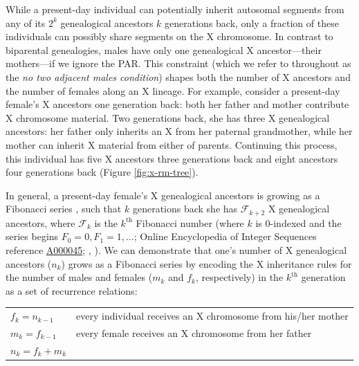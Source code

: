 \documentclass[9pt,twocolumn,twoside]{gsajnl}
\begin{document}
While a present-day individual can potentially inherit autosomal segments from
any of its $2^k$ genealogical ancestors $k$ generations back, only a fraction
of these individuals can possibly share segments on the X chromosome. In
contrast to biparental genealogies, males have only one genealogical X
ancestor---their mothers---if we ignore the PAR. This constraint (which we
refer to throughout as the \emph{no two adjacent males condition}) shapes both
the number of X ancestors and the number of females along an X lineage. For
example, consider a present-day female's X ancestors one generation back: both
her father and mother contribute X chromosome material. Two generations back,
she has three X genealogical ancestors: her father only inherits an X from her
paternal grandmother, while her mother can inherit X material from either of
parents. Continuing this process, this individual has five X ancestors three
generations back and eight ancestors four generations back (Figure
\ref{fig:x-rm-tree}). 


In general, a present-day female's X genealogical ancestors is growing as a
Fibonacci series \citep{laughlin1920calculating, Basin:1963wf}, such that $k$
generations back she has $\mathcal{F}_{k+2}$ X genealogical ancestors, where
$\mathcal{F}_k$ is the $k^\text{th}$ Fibonacci number (where $k$ is 0-indexed
and the series begins $F_0 = 0, F_1 = 1, \ldots$; Online Encyclopedia of
Integer Sequences reference \href{https://oeis.org/A000045}{A000045};
\citeauthor{sloane2014online}, \citeyear{sloane2014online}). We can demonstrate
that one's number of X genealogical ancestors ($n_k$) grows as a Fibonacci
series by encoding the X inheritance rules for the number of males and females
($m_k$ and $f_k$, respectively) in the $k^\text{th}$ generation as a set of
recurrence relations:

\begin{table}[htbp]
\centering
\begin{tableminipage}{\linewidth}
  \begin{tabularx}{\linewidth}{X X}
  $f_k = n_{k-1}$ & every individual receives an X chromosome from his/her mother \\
  $m_k = f_{k-1}$ & every female receives an X chromosome from her father \\
  $n_k = f_k + m_k$ & \\
\end{tabularx}
\end{tableminipage}
\end{table}
\end{document}
